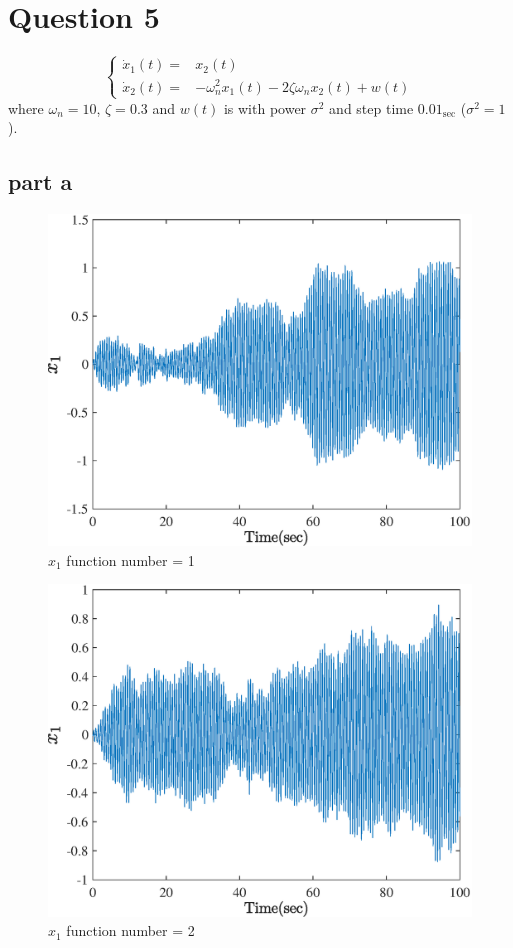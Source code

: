 \section{Question 5}
$$
\left\lbrace \begin{array}{cl}
    \dot{x}_1(t)  =& x_2(t)\\[1em]
    \dot{x}_2(t)  =& -\omega_n^2x_1(t) - 2\zeta\omega_nx_2(t) + w(t)
    \end{array}\right.
$$
where $\omega_n = 10$, $\zeta = 0.3$ and $w(t)$ is with power $\sigma^2$ and step time $0.01_{\sec}$ ($\sigma^2 = 1$).
\subsection{part a}
  \begin{figure}[H] 
  	\caption{$x_1$ function number = 1} 
  	\centering 
  	\includegraphics[width=12cm]{../Figure/Q5/part_a/1} 
  \end{figure}
  \begin{figure}[H] 
  	\caption{$x_1$ function number = 2} 
  	\centering 
  	\includegraphics[width=12cm]{../Figure/Q5/part_a/2} 
  \end{figure}
